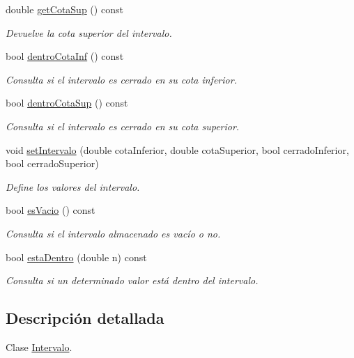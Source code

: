 \begin{DoxyCompactItemize}
double \mbox{\hyperlink{classIntervalo_a2dd767a860e4e85ec3d5a44e78884b76}{get\+Cota\+Sup}} () const
\begin{DoxyCompactList}\small\item\em Devuelve la cota superior del intervalo. \end{DoxyCompactList}\item 
bool \mbox{\hyperlink{classIntervalo_aac8f7b98dd0d702086ea897f5c9ad932}{dentro\+Cota\+Inf}} () const
\begin{DoxyCompactList}\small\item\em Consulta si el intervalo es cerrado en su cota inferior. \end{DoxyCompactList}\item 
bool \mbox{\hyperlink{classIntervalo_aed0964a68d4b727bd104f5128ee7a7ef}{dentro\+Cota\+Sup}} () const
\begin{DoxyCompactList}\small\item\em Consulta si el intervalo es cerrado en su cota superior. \end{DoxyCompactList}\item 
void \mbox{\hyperlink{classIntervalo_a3e7cfa7c148a4e60be7040fecf506313}{set\+Intervalo}} (double cota\+Inferior, double cota\+Superior, bool cerrado\+Inferior, bool cerrado\+Superior)
\begin{DoxyCompactList}\small\item\em Define los valores del intervalo. \end{DoxyCompactList}\item 
bool \mbox{\hyperlink{classIntervalo_adc77e18147f9f9f85476a0d44257bb02}{es\+Vacio}} () const
\begin{DoxyCompactList}\small\item\em Consulta si el intervalo almacenado es vacío o no. \end{DoxyCompactList}\item 
bool \mbox{\hyperlink{classIntervalo_a2cccd9264f1b3912c6006fe3e2a70289}{esta\+Dentro}} (double n) const
\begin{DoxyCompactList}\small\item\em Consulta si un determinado valor está dentro del intervalo. \end{DoxyCompactList}\end{DoxyCompactItemize}


\subsection{Descripción detallada}
Clase \mbox{\hyperlink{classIntervalo}{Intervalo}}. 

